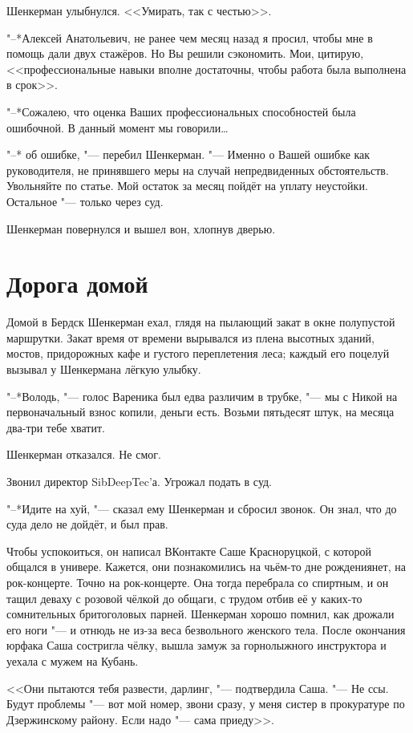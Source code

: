 Шенкерман улыбнулся.
<<Умирать, так с честью>>.

"--*Алексей Анатольевич, не ранее чем месяц назад я просил, чтобы мне в помощь дали двух стажёров.
Но Вы решили сэкономить.
Мои, цитирую, <<профессиональные навыки вполне достаточны, чтобы работа была выполнена в срок>>.

"--*Сожалею, что оценка Ваших профессиональных способностей была ошибочной.
В данный момент мы говорили\ldots

"--* \ldotst об ошибке, "--- перебил Шенкерман.
"--- Именно о Вашей ошибке как руководителя, не принявшего меры на случай непредвиденных обстоятельств.
Увольняйте по статье.
Мой остаток за месяц пойдёт на уплату неустойки.
Остальное "--- только через суд.

Шенкерман повернулся и вышел вон, хлопнув дверью.

\section{Дорога домой}

Домой в Бердск Шенкерман ехал, глядя на пылающий закат в окне полупустой маршрутки.
Закат время от времени вырывался из плена высотных зданий, мостов, придорожных кафе и густого переплетения леса;
каждый его поцелуй вызывал у Шенкермана лёгкую улыбку.

"--*Володь, "--- голос Вареника был едва различим в трубке, "--- мы с Никой на первоначальный взнос копили, деньги есть.
Возьми пятьдесят штук, на месяца два-три тебе хватит.

Шенкерман отказался.
Не смог.

Звонил директор SibDeepTec'а.
Угрожал подать в суд.

"--*Идите на хуй, "--- сказал ему Шенкерман и сбросил звонок.
Он знал, что до суда дело не дойдёт, и был прав.

Чтобы успокоиться, он написал ВКонтакте Саше Красноруцкой, с которой общался в универе.
Кажется, они познакомились на чьём-то дне рождения\ldotst нет, на рок-концерте.
Точно на рок-концерте.
Она тогда перебрала со спиртным, и он тащил деваху с розовой чёлкой до общаги, с трудом отбив её у каких-то сомнительных бритоголовых парней.
Шенкерман хорошо помнил, как дрожали его ноги "--- и отнюдь не из-за веса безвольного женского тела.
После окончания юрфака Саша состригла чёлку, вышла замуж за горнолыжного инструктора и уехала с мужем на Кубань.

<<Они пытаются тебя развести, дарлинг, "--- подтвердила Саша.
"--- Не ссы.
Будут проблемы "--- вот мой номер, звони сразу, у меня систер в прокуратуре по Дзержинскому району.
Если надо "--- сама приеду>>.

